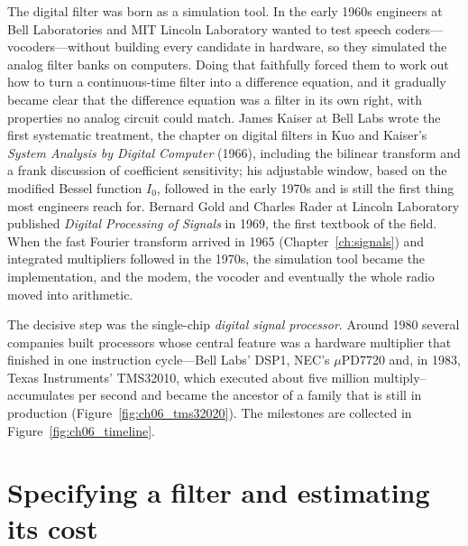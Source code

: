 \begin{history}
The digital filter was born as a simulation tool. In the early 1960s engineers at Bell
Laboratories and MIT Lincoln Laboratory wanted to test speech coders---vocoders---without
building every candidate in hardware, so they simulated the analog filter banks on computers.
Doing that faithfully forced them to work out how to turn a continuous-time filter into a
difference equation, and it gradually became clear that the difference equation was a filter in
its own right, with properties no analog circuit could match. James Kaiser at Bell Labs wrote the
first systematic treatment, the chapter on digital filters in Kuo and Kaiser's \emph{System Analysis
by Digital Computer} (1966), including the bilinear transform and a frank discussion of coefficient
sensitivity; his adjustable window, based on the modified Bessel function $I_0$, followed in the
early 1970s and is still the first thing most engineers reach for. Bernard Gold and Charles Rader at
Lincoln Laboratory published \emph{Digital Processing of Signals} in 1969, the first textbook of
the field. When the fast Fourier transform arrived in 1965 (Chapter~\ref{ch:signals}) and integrated
multipliers followed in the 1970s, the simulation tool became the implementation, and the
modem, the vocoder and eventually the whole radio moved into arithmetic.

The decisive step was the single-chip \emph{digital signal processor}. Around 1980 several
companies built processors whose central feature was a hardware multiplier that finished in one
instruction cycle---Bell Labs' DSP1, NEC's $\mu$PD7720 and, in 1983, Texas Instruments' TMS32010,
which executed about five million multiply--accumulates per second and became the ancestor of a
family that is still in production (Figure~\ref{fig:ch06_tms32020}). The milestones are collected in
Figure~\ref{fig:ch06_timeline}.
\end{history}


\section{Specifying a filter and estimating its cost}
\label{sec:ch06:spec}

